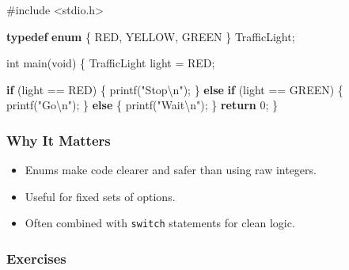 \documentclass[
  letterpaper,
  DIV=11,
  numbers=noendperiod]{scrreprt}
\newenvironment{Shaded}{\begin{snugshade}}{\end{snugshade}}
\newcommand{\ControlFlowTok}[1]{\textcolor[rgb]{0.00,0.23,0.31}{\textbf{#1}}}
\newcommand{\DataTypeTok}[1]{\textcolor[rgb]{0.68,0.00,0.00}{#1}}
\newcommand{\DecValTok}[1]{\textcolor[rgb]{0.68,0.00,0.00}{#1}}
\newcommand{\ImportTok}[1]{\textcolor[rgb]{0.00,0.46,0.62}{#1}}
\newcommand{\KeywordTok}[1]{\textcolor[rgb]{0.00,0.23,0.31}{\textbf{#1}}}
\newcommand{\NormalTok}[1]{\textcolor[rgb]{0.00,0.23,0.31}{#1}}
\newcommand{\OperatorTok}[1]{\textcolor[rgb]{0.37,0.37,0.37}{#1}}
\newcommand{\PreprocessorTok}[1]{\textcolor[rgb]{0.68,0.00,0.00}{#1}}
\newcommand{\SpecialCharTok}[1]{\textcolor[rgb]{0.37,0.37,0.37}{#1}}
\newcommand{\StringTok}[1]{\textcolor[rgb]{0.13,0.47,0.30}{#1}}
\providecommand{\tightlist}{%
  \setlength{\itemsep}{0pt}\setlength{\parskip}{0pt}}
\begin{document}
\begin{Shaded}
\begin{Highlighting}[]
\PreprocessorTok{\#include }\ImportTok{\textless{}stdio.h\textgreater{}}

\KeywordTok{typedef} \KeywordTok{enum} \OperatorTok{\{}
\NormalTok{    RED}\OperatorTok{,}\NormalTok{ YELLOW}\OperatorTok{,}\NormalTok{ GREEN}
\OperatorTok{\}}\NormalTok{ TrafficLight}\OperatorTok{;}

\DataTypeTok{int}\NormalTok{ main}\OperatorTok{(}\DataTypeTok{void}\OperatorTok{)} \OperatorTok{\{}
\NormalTok{    TrafficLight light }\OperatorTok{=}\NormalTok{ RED}\OperatorTok{;}

    \ControlFlowTok{if} \OperatorTok{(}\NormalTok{light }\OperatorTok{==}\NormalTok{ RED}\OperatorTok{)} \OperatorTok{\{}
\NormalTok{        printf}\OperatorTok{(}\StringTok{"Stop}\SpecialCharTok{\textbackslash{}n}\StringTok{"}\OperatorTok{);}
    \OperatorTok{\}} \ControlFlowTok{else} \ControlFlowTok{if} \OperatorTok{(}\NormalTok{light }\OperatorTok{==}\NormalTok{ GREEN}\OperatorTok{)} \OperatorTok{\{}
\NormalTok{        printf}\OperatorTok{(}\StringTok{"Go}\SpecialCharTok{\textbackslash{}n}\StringTok{"}\OperatorTok{);}
    \OperatorTok{\}} \ControlFlowTok{else} \OperatorTok{\{}
\NormalTok{        printf}\OperatorTok{(}\StringTok{"Wait}\SpecialCharTok{\textbackslash{}n}\StringTok{"}\OperatorTok{);}
    \OperatorTok{\}}
    \ControlFlowTok{return} \DecValTok{0}\OperatorTok{;}
\OperatorTok{\}}
\end{Highlighting}
\end{Shaded}

\subsubsection{Why It Matters}\label{why-it-matters-36}

\begin{itemize}
\tightlist
\item
  Enums make code clearer and safer than using raw integers.
\item
  Useful for fixed sets of options.
\item
  Often combined with \texttt{switch} statements for clean logic.
\end{itemize}

\subsubsection{Exercises}\label{exercises-37}
\end{document}
